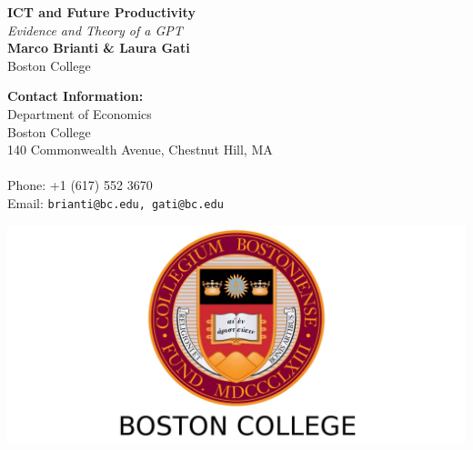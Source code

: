 \documentclass[a0,landscape]{a0poster}
\begin{document}


\begin{minipage}[b]{0.55\linewidth}
\veryHuge \color{NavyBlue} \textbf{ICT and Future Productivity} \color{Black}\\ %
\Huge\textit{Evidence and Theory of a GPT}\\[1cm] %
\huge \textbf{Marco Brianti \& Laura Gati}\\ %
\huge Boston College\\ %
\end{minipage}
%
\begin{minipage}[b]{0.25\linewidth}
\color{DarkSlateGray}\Large \textbf{Contact Information:}\\
Department of Economics\\ %
Boston College\\
140 Commonwealth Avenue, Chestnut Hill, MA \\\\
Phone: +1 (617) 552 3670\\ %
Email: \texttt{brianti@bc.edu, gati@bc.edu}\\ %
\end{minipage}
%
\begin{minipage}[b]{0.19\linewidth}
\includegraphics[width=25cm]{logo.jpg} %
\end{minipage}
\end{document}

